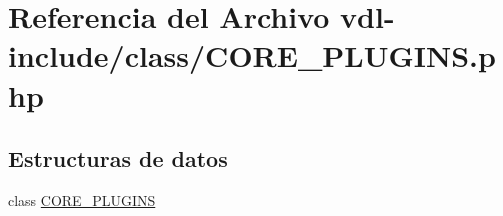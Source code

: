 \hypertarget{CORE__PLUGINS_8php}{\section{Referencia del Archivo vdl-\/include/class/\-C\-O\-R\-E\-\_\-\-P\-L\-U\-G\-I\-N\-S.php}
\label{CORE__PLUGINS_8php}
}
\subsection*{Estructuras de datos}
\begin{DoxyCompactItemize}
\item 
class \hyperlink{classCORE__PLUGINS}{C\-O\-R\-E\-\_\-\-P\-L\-U\-G\-I\-N\-S}
\end{DoxyCompactItemize}
